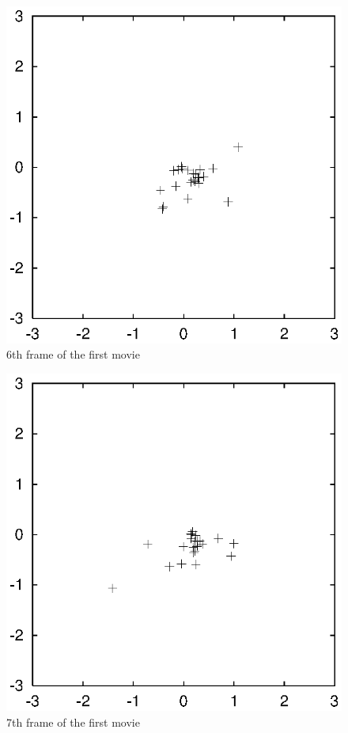 \begin{figure}[htb]
\centering
\includegraphics[width=4.5in]{chap10/movietmp_nbody1.out.5.ps}
\caption[6th frame of movie \#1]
{6th frame of the first movie}
\label{fig:movie1.6}
\end{figure}

\begin{figure}[htb]
\centering
\includegraphics[width=4.5in]{chap10/movietmp_nbody1.out.6.ps}
\caption[7th frame of movie \#1]
{7th frame of the first movie}
\label{fig:movie1.7}
\end{figure}

